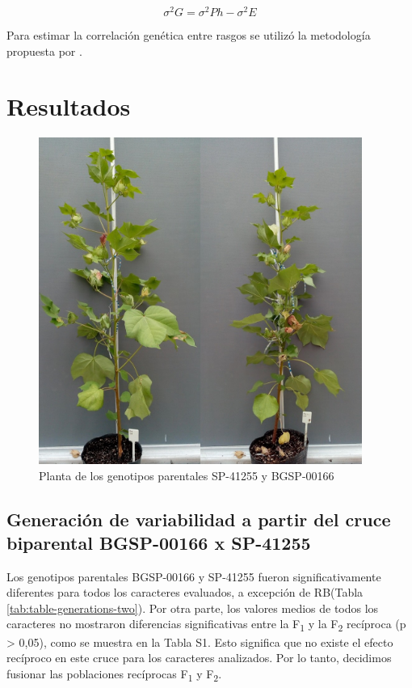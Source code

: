 \documentclass[12pt,oneside]{reedthesis}
\begin{document}
\[ \sigma^{2}G = \sigma^{2}Ph - \sigma^{2}E \]

Para estimar la correlación genética entre rasgos se utilizó la metodología propuesta por \textcite{kearsey1996} .

\section{Resultados}\label{resultados-1}

\begin{figure}
\includegraphics[width=400px]{figure/chap3/Parentales} \caption{Planta de los genotipos parentales SP-41255 y BGSP-00166}\label{fig:img-parental}
\end{figure}

\subsection{Generación de variabilidad a partir del cruce biparental BGSP-00166 x SP-41255}\label{generaciuxf3n-de-variabilidad-a-partir-del-cruce-biparental-bgsp-00166-x-sp-41255}

Los genotipos parentales BGSP-00166 y SP-41255 fueron significativamente diferentes para todos los caracteres evaluados, a excepción de RB(Tabla \ref{tab:table-generations-two}). Por otra parte, los valores medios de todos los caracteres no mostraron diferencias significativas entre la F\textsubscript{1} y la F\textsubscript{2} recíproca (p \textgreater{} 0,05), como se muestra en la Tabla S1. Esto significa que no existe el efecto recíproco en este cruce para los caracteres analizados. Por lo tanto, decidimos fusionar las poblaciones recíprocas F\textsubscript{1} y F\textsubscript{2}.
\end{document}
